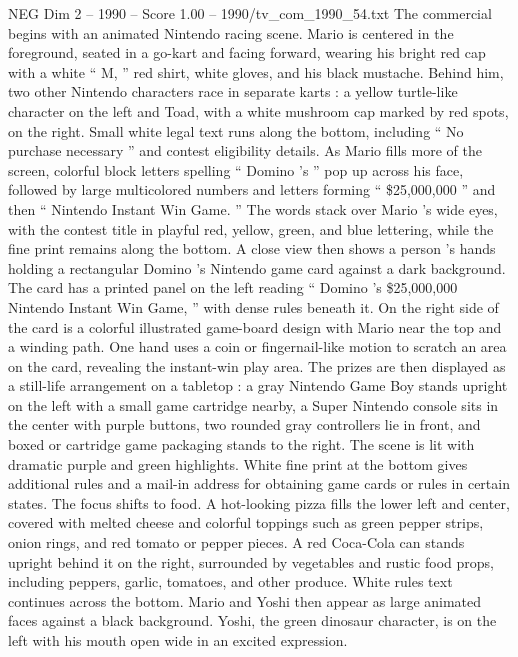 \begin{textsample}{NEG Dim 2 – 1990 – Score 1.00 – 1990/tv\_com\_1990\_54.txt}  \label{ex:f2_neg_068}
The commercial begins with an animated Nintendo racing scene.
Mario is centered in the foreground, seated in a go-kart and facing forward, wearing his bright red cap with a white “ M, ” red shirt, white gloves, and his black mustache.
Behind him, two other Nintendo characters race in separate karts : a yellow turtle-like character on the left and Toad, with a white mushroom cap marked by red spots, on the right.
Small white legal text runs along the bottom, including “ No purchase necessary ” and contest eligibility details.
As Mario fills more of the screen, colorful block letters spelling “ Domino ’s ” pop up across his face, followed by large multicolored numbers and letters forming “ \$25,000,000 ” and then “ Nintendo Instant Win Game. ” The words stack over Mario ’s wide eyes, with the contest title in playful red, yellow, green, and blue lettering, while the fine print remains along the bottom.
A close view then shows a person ’s hands holding a rectangular Domino ’s Nintendo game card against a dark background.
The card has a printed panel on the left reading “ Domino ’s \$25,000,000 Nintendo Instant Win Game, ” with dense rules beneath it.
On the right side of the card is a colorful illustrated game-board design with Mario near the top and a winding path.
One hand uses a coin or fingernail-like motion to scratch an area on the card, revealing the instant-win play area.
The prizes are then displayed as a still-life arrangement on a tabletop : a gray Nintendo Game Boy stands upright on the left with a small game cartridge nearby, a Super Nintendo console sits in the center with purple buttons, two rounded gray controllers lie in front, and boxed or cartridge game packaging stands to the right.
The scene is lit with dramatic purple and green highlights.
White fine print at the bottom gives additional rules and a mail-in address for obtaining game cards or rules in certain states.
The focus shifts to food.
A hot-looking pizza fills the lower left and center, covered with melted cheese and colorful toppings such as green pepper strips, onion rings, and red tomato or pepper pieces.
A red Coca-Cola can stands upright behind it on the right, surrounded by vegetables and rustic food props, including peppers, garlic, tomatoes, and other produce.
White rules text continues across the bottom.
Mario and Yoshi then appear as large animated faces against a black background.
Yoshi, the green dinosaur character, is on the left with his mouth open wide in an excited expression.

\end{textsample}
